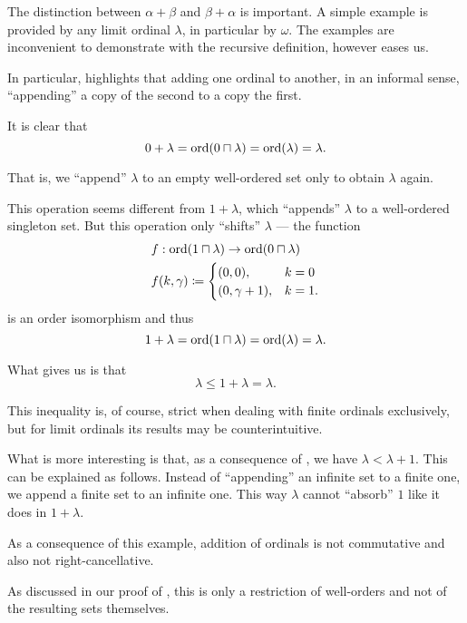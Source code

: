 \begin{example}\label{ex:ordinal_addition}
  The distinction between \( \alpha + \beta \) and \( \beta + \alpha \) is important. A simple example is provided by any limit ordinal \( \lambda \), in particular by \( \omega \). The examples are inconvenient to demonstrate with the recursive definition, however  eases us.

  In particular,  highlights that adding one ordinal to another, in an informal sense, \enquote{appending} a copy of the second to a copy the first.

  It is clear that
  \begin{equation*}
    0 + \lambda = \operatorname{ord}(0 \sqcap \lambda) = \operatorname{ord}(\lambda) = \lambda.
  \end{equation*}

  That is, we \enquote{append} \( \lambda \) to an empty well-ordered set only to obtain \( \lambda \) again.

  This operation seems different from \( 1 + \lambda \), which \enquote{appends} \( \lambda \) to a well-ordered singleton set. But this operation only \enquote{shifts} \( \lambda \) --- the function
  \begin{equation*}
    \begin{aligned}
      &f: \operatorname{ord}(1 \sqcap \lambda) \to \operatorname{ord}(0 \sqcap \lambda) \\
      &f(k, \gamma) \coloneqq \begin{cases}
        (0, 0),          &k = 0 \\
        (0, \gamma + 1), &k = 1.
      \end{cases}
    \end{aligned}
  \end{equation*}
  is an order isomorphism and thus
  \begin{equation*}
    1 + \lambda = \operatorname{ord}(1 \sqcap \lambda) = \operatorname{ord}(\lambda) = \lambda.
  \end{equation*}

  What  gives us is that
  \begin{equation*}
    \lambda \leq 1 + \lambda = \lambda.
  \end{equation*}

  This inequality is, of course, strict when dealing with finite ordinals exclusively, but for limit ordinals its results may be counterintuitive.

  What is more interesting is that, as a consequence of , we have \( \lambda < \lambda + 1 \). This can be explained as follows. Instead of \enquote{appending} an infinite set to a finite one, we append a finite set to an infinite one. This way \( \lambda \) cannot \enquote{absorb} \( 1 \) like it does in \( 1 + \lambda \).

  As a consequence of this example, addition of ordinals is not commutative and also not right-cancellative.

  As discussed in our proof of , this is only a restriction of well-orders and not of the resulting sets themselves.
\end{example}

